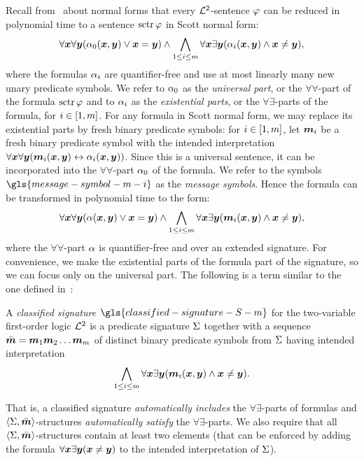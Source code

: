 Recall from~ about normal forms that every $\mathcal{L}^{2}$-sentence
$\varphi$ can be reduced in polynomial time to a sentence $\operatorname{sctr}\varphi$ in Scott
normal form:
\[
  \forall\bm{x}\forall\bm{y} (\alpha_{0}(\bm{x},\bm{y}) \lor \bm{x} = \bm{y}) \land
  \bigwedge_{1 \leq i \leq m} \forall\bm{x}\exists\bm{y}(
  \alpha_{i}(\bm{x},\bm{y}) \land \bm{x} \neq \bm{y}),
\]
where the formulas $\alpha_{i}$ are quantifier-free and use at most linearly many
new unary predicate symbols. We refer to $\alpha_{0}$ as the \emph{universal part},
or the $\forall\forall$-part of the formula $\operatorname{sctr}\varphi$ and to $\alpha_{i}$ as
the \emph{existential parts}, or the $\forall\exists$-parts of the formula,
for $i \in [1,m]$.
For any formula in Scott normal form, we may replace its existential parts
by fresh binary predicate symbols: for $i \in [1,m]$, let $\bm{m}_{i}$ be a
fresh binary predicate symbol with the intended interpretation
$\forall\bm{x}\forall\bm{y} (\bm{m}_{i}(\bm{x},\bm{y}) \leftrightarrow \alpha_{i}(\bm{x},\bm{y}))$.
Since this is a universal sentence, it can be incorporated into the
$\forall\forall$-part $\alpha_{0}$ of the formula.
We refer to the symbols $\gls{message-symbol-m-i}$ as the \emph{message
symbols}.
Hence the formula can be transformed in polynomial time to the form:
\begin{equation}\label{eq:twovar-msg-nf}
  \forall\bm{x}\forall\bm{y} (\alpha(\bm{x},\bm{y}) \lor \bm{x} = \bm{y}) \land
  \bigwedge_{1 \leq i \leq m} \forall\bm{x}\exists\bm{y}
  (\bm{m}_{i}(\bm{x},\bm{y}) \land \bm{x} \neq \bm{y}),
\end{equation}
where the $\forall\forall$-part $\alpha$ is quantifier-free and over an extended
signature. For convenience, we make the existential parts of the formula part of
the signature, so we can focus only on the universal part. The following is a
term similar to the one defined in~\cite{MALQ:MALQ201400102}:
\begin{definition}
A \emph{classified signature} $\gls{classified-signature-S-m}$ for the
two-variable first-order logic $\mathcal{L}^{2}$ is a predicate signature $\mathrm{\Sigma}$ together
with a sequence $\sms = \smm1\smm2\dots\smm\nm$ of distinct binary predicate
symbols from $\mathrm{\Sigma}$ having intended interpretation
\begin{equation}\label{eq:twovar-ms-iinter}
  \bigwedge_{1 \leq i \leq m} \forall\bm{x}\exists\bm{y} 
  (\bm{m}_{i}(\bm{x},\bm{y}) \land \bm{x} \neq \bm{y}).
\end{equation}
\end{definition}
That is, a classified signature \emph{automatically includes} the
$\forall\exists$-parts of formulas and $\left\langle \mathrm{\Sigma},\bar{\bm{m}} \right\rangle$-structures
\emph{automatically satisfy} the $\forall\exists$-parts. We also require that
all $\left\langle \mathrm{\Sigma},\bar{\bm{m}} \right\rangle$-structures contain at least two elements (that can be
enforced by adding the formula $\forall\bm{x}\exists\bm{y}(\bm{x}\neq\bm{y})$ to the
intended interpretation of $\mathrm{\Sigma}$).

